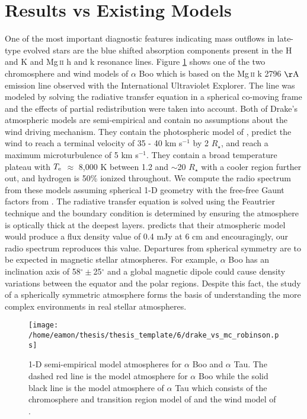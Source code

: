 \section{Results vs Existing Models}\label{sec:6.5}
One of the most important diagnostic features indicating mass outflows in late-type evolved stars are the blue shifted absorption components present in the  H and K and Mg\,\textsc{ii} h and k resonance lines. Figure \ref{fig6.5.1} shows one of the two chromosphere and wind models of $\alpha$ Boo \cite[`model A']{drake_1985} which is based on the Mg\,\textsc{ii} k 2796 $\rm{\AA}$ emission line observed with the International Ultraviolet Explorer. The line was modeled by solving the radiative transfer equation in a spherical co-moving frame and the effects of partial redistribution \citep[e.g.,][]{drake_1983b} were taken into account. Both of Drake’s atmospheric models
are semi-empirical and contain no assumptions about the wind driving mechanism. They contain the photospheric model of \cite{ayres_1975}, predict the wind to reach a terminal velocity of 35 - 40 km s${}^{-1}$ by 2 $R _{\star}$, and reach a maximum microturbulence of 5 km s$^{-1}$. They contain a broad temperature plateau with $T_{\rm{e}}$ $\approx$ 8,000 K between 1.2 and $\sim$20 $R _{\star}$ with a cooler region further out, and hydrogen is 50\% ionized throughout. We compute the radio spectrum from these models assuming spherical 1-D geometry \citep{harper_1994} with the free-free Gaunt factors from \cite{hummer_1988}. The radiative transfer equation is solved using the Feautrier technique \citep{mihalas_1978} and the boundary condition is determined by ensuring the atmosphere is optically thick at the deepest layers. \cite{drake_1985} predicts that their atmospheric model would produce a flux density value of 0.4 mJy at 6 cm and encouragingly, our radio spectrum reproduces this value. Departures from spherical symmetry are to be expected in magnetic stellar atmospheres. For example, $\alpha$ Boo has an inclination axis of 58$^{\circ} \pm$25$^{\circ}$ \citep{gray_2006} and a global magnetic dipole could cause density variations between the equator and the polar regions. Despite this fact, the study of a  spherically symmetric atmosphere forms the basis of understanding the more complex environments in real stellar atmospheres.

\begin{figure}[hbt!]
\centering 
          \texttt{[image: /home/eamon/thesis/thesis\_template/6/drake\_vs\_mc\_robinson.ps]}
\caption[1-D semi-empirical model atmospheres for $\alpha$ Boo and $\alpha$ Tau.]{1-D semi-empirical model atmospheres for $\alpha$ Boo and $\alpha$ Tau. The dashed red line is the model atmosphere for $\alpha$ Boo \citep{drake_1985} while the solid black line is the model atmosphere of $\alpha$ Tau which consists of the chromosphere and transition region model of \cite{mcmurry_1999} and the wind model of \cite{robinson_1998}.}
\label{fig6.5.1}
\end{figure}

